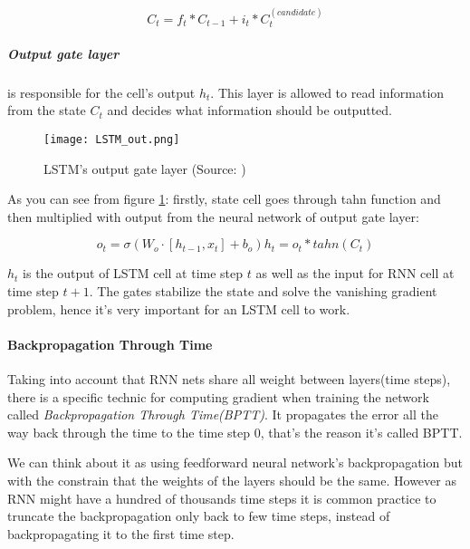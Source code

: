 \begin{equation} \label{eq:update_state}
	C_t = f_t * C_{t-1} + i_t * C_t^{(candidate)}
\end{equation}

\subparagraph{Output gate layer} is responsible for the cell's output $h_t$.
This layer is allowed to read information from the state $C_t$ and decides what information
should be outputted.
\begin{figure}[H]
	\texttt{[image: LSTM\_out.png]}
	\caption{
		LSTM's output gate layer (Source: \cite{ColahChristopher2015})
		}
	\label{img:lstm_out}
\end{figure}

As you can see from figure \ref{img:lstm_out}: firstly, state cell goes
through tahn function and then multiplied
with output from the neural network of output gate layer:

\begin{equation} \label{eq:out_gate}
	o_t = \sigma (W_o \cdot [h_{t-1}, x_t] + b_o)
	h_t = o_t * tahn(C_t)
\end{equation}

$h_t$ is the output of LSTM cell at time step $t$ as well as the input
for RNN cell at time step $t+1$. The gates stabilize the state and solve the
vanishing gradient problem, hence it's very important for an LSTM
cell to work.\cite{Goodfellow-et-al-2016}

\paragraph{Backpropagation Through Time} Taking into account that RNN nets
share all weight between layers(time steps), there is a specific
technic for computing
gradient when training the network called \emph{Backpropagation Through Time(BPTT)}.
It propagates the error all the way back through the time to the time step 0,
that's the reason it's called BPTT. \cite{werbos:bptt}

We can think about it as using feedforward neural network's backpropagation
but with the constrain that the weights of the layers should be the same.
However as RNN might have a hundred of thousands time steps it is common
practice to truncate the backpropagation only back to few time steps, instead
of backpropagating it to the first time step.





